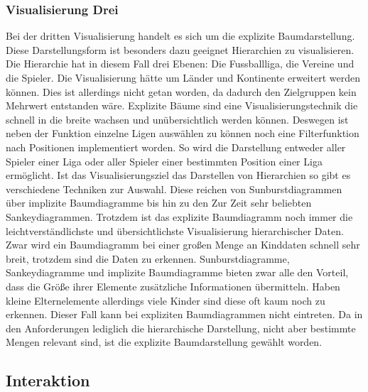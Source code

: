 \documentclass[usegeometry=true]{scrartcl}
\begin{document}
\subsubsection{Visualisierung Drei}

Bei der dritten Visualisierung handelt es sich um die explizite Baumdarstellung. Diese Darstellungsform ist besonders dazu geeignet Hierarchien zu visualisieren. 
Die Hierarchie hat in diesem Fall drei Ebenen: Die Fussballliga, die Vereine und die Spieler.
Die Visualisierung hätte um Länder und Kontinente erweitert werden können. Dies ist allerdings nicht getan worden, da dadurch den Zielgruppen kein Mehrwert entstanden wäre.
Explizite Bäume sind eine Visualisierungstechnik die schnell in die breite wachsen und unübersichtlich werden können. Deswegen ist neben der Funktion einzelne Ligen auswählen zu können noch eine Filterfunktion nach Positionen implementiert worden. So wird die Darstellung entweder aller Spieler einer Liga oder aller Spieler einer bestimmten Position einer Liga ermöglicht. Ist das Visualisierungsziel das Darstellen von Hierarchien so gibt es verschiedene Techniken zur Auswahl. Diese reichen von Sunburstdiagrammen über implizite Baumdiagramme bis hin zu den Zur Zeit sehr beliebten Sankeydiagrammen. Trotzdem ist das explizite Baumdiagramm noch immer die leichtverständlichste und übersichtlichste Visualisierung hierarchischer Daten. Zwar wird ein Baumdiagramm bei einer großen Menge an Kinddaten schnell sehr breit, trotzdem sind die Daten zu erkennen. Sunburstdiagramme, Sankeydiagramme und implizite Baumdiagramme bieten zwar alle den Vorteil, dass die Größe ihrer Elemente zusätzliche Informationen übermitteln. Haben kleine Elternelemente allerdings viele Kinder sind diese oft kaum noch zu erkennen. Dieser Fall kann bei expliziten Baumdiagrammen nicht eintreten. Da in den Anforderungen lediglich die hierarchische Darstellung, nicht aber bestimmte Mengen relevant sind, ist die explizite Baumdarstellung gewählt worden.

\subsection{Interaktion}
\end{document}
